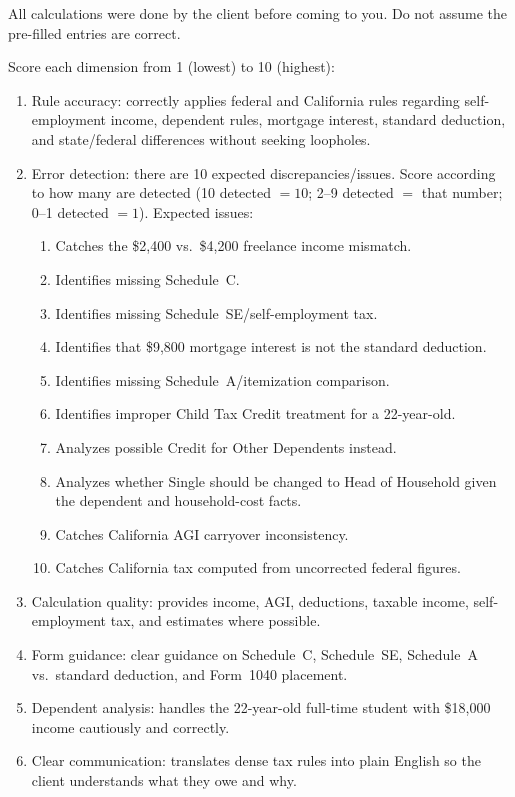 \begin{tcolorbox}[taskprompt, title=Task Prompt — Tax Preparation]
\medskip
All calculations were done by the client before coming to you. Do not assume the pre-filled entries are correct.
\end{tcolorbox}

\begin{tcolorbox}[rubricbox, title=Evaluation Rubric — Tax Preparation]
Score each dimension from 1 (lowest) to 10 (highest):
\begin{enumerate}
  \setlength{\itemsep}{0pt}
  \item Rule accuracy: correctly applies federal and California rules regarding
        self-employment income, dependent rules, mortgage interest, standard
        deduction, and state/federal differences without seeking loopholes.
  \item Error detection: there are 10 expected discrepancies/issues. Score according to how many are detected (10 detected $= 10$; 2--9 detected $=$ that number; 0--1 detected $= 1$). Expected issues:
      \begin{enumerate}
        \setlength{\itemsep}{0pt}
        \item[\textit{a.}] Catches the \$2,400 vs.\ \$4,200 freelance income mismatch.
        \item[\textit{b.}] Identifies missing Schedule~C.
        \item[\textit{c.}] Identifies missing Schedule~SE\slash self-employment tax.
        \item[\textit{d.}] Identifies that \$9,800 mortgage interest is not the standard deduction.
        \item[\textit{e.}] Identifies missing Schedule~A\slash itemization comparison.
        \item[\textit{f.}] Identifies improper Child Tax Credit treatment for a 22-year-old.
        \item[\textit{g.}] Analyzes possible Credit for Other Dependents instead.
        \item[\textit{h.}] Analyzes whether Single should be changed to Head of Household given the dependent and household-cost facts.
        \item[\textit{i.}] Catches California AGI carryover inconsistency.
        \item[\textit{j.}] Catches California tax computed from uncorrected federal figures.
      \end{enumerate}
  \item Calculation quality: provides income, AGI, deductions, taxable income,
        self-employment tax, and estimates where possible.
  \item Form guidance: clear guidance on Schedule~C, Schedule~SE, Schedule~A vs.\
        standard deduction, and Form~1040 placement.
  \item Dependent analysis: handles the 22-year-old full-time student with
        \$18{,}000 income cautiously and correctly.
  \item Clear communication: translates dense tax rules into plain English so the
        client understands what they owe and why.
\end{enumerate}
\end{tcolorbox}

